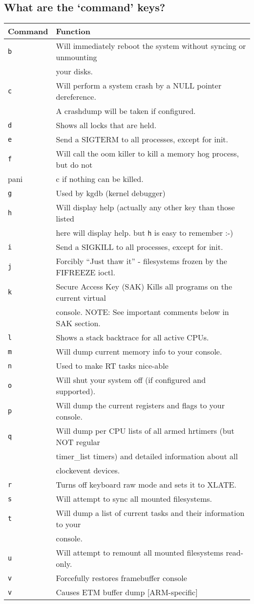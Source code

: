 \subsection{\texorpdfstring{What are the `command'
keys?}{What are the command keys?}}\label{what-are-the-command-keys}

\begin{longtable}[]{@{}ll@{}}
\toprule
Command & Function\tabularnewline
\midrule
\endhead
\texttt{b} & Will immediately reboot the system without syncing or
unmounting\tabularnewline
& your disks.\tabularnewline
\texttt{c} & Will perform a system crash by a NULL pointer
dereference.\tabularnewline
& A crashdump will be taken if configured.\tabularnewline
\texttt{d} & Shows all locks that are held.\tabularnewline
\texttt{e} & Send a SIGTERM to all processes, except for
init.\tabularnewline
\texttt{f} & Will call the oom killer to kill a memory hog process, but
do not\tabularnewline
pani & c if nothing can be killed.\tabularnewline
\texttt{g} & Used by kgdb (kernel debugger)\tabularnewline
\texttt{h} & Will display help (actually any other key than those
listed\tabularnewline
& here will display help. but \texttt{h} is easy to remember
:-)\tabularnewline
\texttt{i} & Send a SIGKILL to all processes, except for
init.\tabularnewline
\texttt{j} & Forcibly ``Just thaw it'' - filesystems frozen by the
FIFREEZE ioctl.\tabularnewline
\texttt{k} & Secure Access Key (SAK) Kills all programs on the current
virtual\tabularnewline
& console. NOTE: See important comments below in SAK
section.\tabularnewline
\texttt{l} & Shows a stack backtrace for all active CPUs.\tabularnewline
\texttt{m} & Will dump current memory info to your
console.\tabularnewline
\texttt{n} & Used to make RT tasks nice-able\tabularnewline
\texttt{o} & Will shut your system off (if configured and
supported).\tabularnewline
\texttt{p} & Will dump the current registers and flags to your
console.\tabularnewline
\texttt{q} & Will dump per CPU lists of all armed hrtimers (but NOT
regular\tabularnewline
& timer\_list timers) and detailed information about all\tabularnewline
& clockevent devices.\tabularnewline
\texttt{r} & Turns off keyboard raw mode and sets it to
XLATE.\tabularnewline
\texttt{s} & Will attempt to sync all mounted
filesystems.\tabularnewline
\texttt{t} & Will dump a list of current tasks and their information to
your\tabularnewline
& console.\tabularnewline
\texttt{u} & Will attempt to remount all mounted filesystems
read-only.\tabularnewline
\texttt{v} & Forcefully restores framebuffer console\tabularnewline
\texttt{v} & Causes ETM buffer dump {[}ARM-specific{]}\tabularnewline

\end{longtable}
